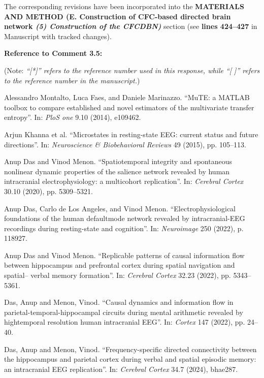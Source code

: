 \documentclass[12pt,technote,onecolumn]{IEEEtran}
\begin{document}
The corresponding revisions have been incorporated into the \textbf{MATERIALS AND METHOD (E. Construction of CFC-based directed brain network \textit{(5) Construction of the CFCDBN)}} section (see \textbf{lines 424–427} in Manuscript with tracked changes).

\vspace{1mm}

\noindent \textbf{Reference to Comment 3.5:} 

\noindent(Note: \textit{``[*]'' refers to the reference number used in this response, while ``[ ]'' refers to the reference number in the manuscript.})

\noindent[*1]\:Alessandro Montalto, Luca Faes, and Daniele Marinazzo.
``MuTE: a MATLAB toolbox to compare established
and novel estimators of the multivariate transfer
entropy”. In: \textit{PloS one} 9.10 (2014), e109462.

\noindent[*2]\:Arjun Khanna et al. ``Microstates in resting-state EEG: current status and future directions”. In: \textit{Neuroscience \& Biobehavioral Reviews} 49 (2015), pp. 105–113.

\noindent[*3]\:Anup Das and Vinod Menon. ``Spatiotemporal integrity
and spontaneous nonlinear dynamic properties of the
salience network revealed by human intracranial electrophysiology:
a multicohort replication”. In: \textit{Cerebral
Cortex} 30.10 (2020), pp. 5309–5321.


\noindent[*4]\:Anup Das, Carlo de Los Angeles, and Vinod Menon.
``Electrophysiological foundations of the human defaultmode
network revealed by intracranial-EEG recordings
during resting-state and cognition”. In: \textit{Neuroimage} 250
(2022), p. 118927.

\noindent[*5]\:Anup Das and Vinod Menon. ``Replicable patterns
of causal information flow between hippocampus and
prefrontal cortex during spatial navigation and spatial–
verbal memory formation”. In: \textit{Cerebral Cortex} 32.23
(2022), pp. 5343–5361.

\noindent[*6]\:Das, Anup and Menon, Vinod. ``Causal dynamics
and information flow in parietal-temporal-hippocampal
circuits during mental arithmetic revealed by hightemporal
resolution human intracranial EEG”. In: \textit{Cortex}
147 (2022), pp. 24–40.

\noindent[*7]\:Das, Anup and Menon, Vinod. ``Frequency-specific directed
connectivity between the hippocampus and parietal
cortex during verbal and spatial episodic memory:
an intracranial EEG replication”. In: \textit{Cerebral Cortex}
34.7 (2024), bhae287.
\end{document}
